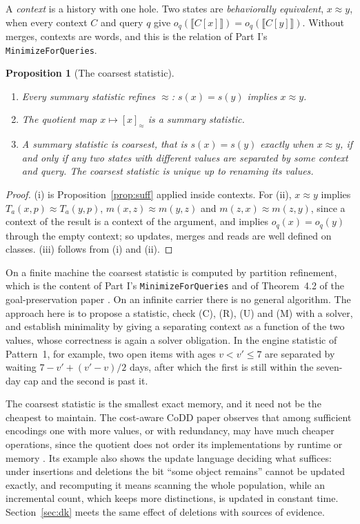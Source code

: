 \documentclass[11pt]{article}
\newcommand{\code}[1]{\texttt{#1}}
\theoremstyle{definition}
\theoremstyle{plain}
\newtheorem{proposition}[definition]{Proposition}
\begin{document}
A \emph{context} is a history with one hole. Two states are \emph{behaviorally equivalent},
$x\approx y$, when every context $C$ and query $q$ give $o_q(\llbracket C[x]\rrbracket)=
o_q(\llbracket C[y]\rrbracket)$. Without merges, contexts are words, and this is the relation of
Part I's \code{MinimizeForQueries}.

\begin{proposition}[The coarsest statistic]\label{prop:coarsest}
\leavevmode
\begin{enumerate}[label=(\roman*)]
\item Every summary statistic refines $\approx$: $s(x)=s(y)$ implies $x\approx y$.
\item The quotient map $x\mapsto[x]_{\approx}$ is a summary statistic.
\item A summary statistic is coarsest, that is $s(x)=s(y)$ exactly when $x\approx y$, if and only
  if any two states with different values are separated by some context and query. The coarsest
  statistic is unique up to renaming its values.
\end{enumerate}
\end{proposition}

\begin{proof}
(i) is Proposition~\ref{prop:suff} applied inside contexts. For (ii), $x\approx y$ implies
$T_a(x,p)\approx T_a(y,p)$, $m(x,z)\approx m(y,z)$ and $m(z,x)\approx m(z,y)$, since a context of
the result is a context of the argument, and implies $o_q(x)=o_q(y)$ through the empty context; so
updates, merges and reads are well defined on classes. (iii) follows from (i) and (ii).
\end{proof}

On a finite machine the coarsest statistic is computed by partition refinement, which is the
content of Part I's \code{MinimizeForQueries} and of Theorem~4.2 of the goal-preservation paper
\cite{goalpres}. On an infinite carrier there is no general algorithm. The approach here is to
propose a statistic, check (C), (R), (U) and (M) with a solver, and establish minimality by giving
a separating context as a function of the two values, whose correctness is again a solver
obligation. In the engine statistic of Pattern~1, for example, two open items with ages $v<v'\le
7$ are separated by waiting $7-v'+(v'-v)/2$ days, after which the first is still within the
seven-day cap and the second is past it.

The coarsest statistic is the smallest exact memory, and it need not be the cheapest to maintain.
The cost-aware CoDD paper observes that among sufficient encodings one with more values, or with
redundancy, may have much cheaper operations, since the quotient does not order its
implementations by runtime or memory \cite[Section~6.2]{codd}. Its example also shows the update
language deciding what suffices: under insertions and deletions the bit ``some object remains''
cannot be updated exactly, and recomputing it means scanning the whole population, while an
incremental count, which keeps more distinctions, is updated in constant time.
Section~\ref{sec:dk} meets the same effect of deletions with sources of evidence.
\end{document}
